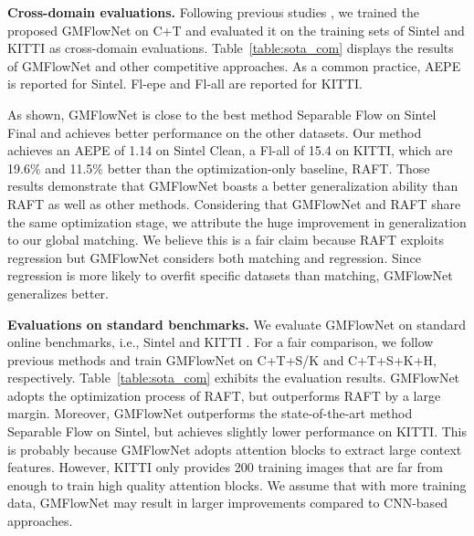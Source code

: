 \documentclass[10pt,twocolumn,letterpaper]{article}
\begin{document}
{\bf Cross-domain evaluations.}
Following previous studies \cite{teed2020raft,jiang2021learning,zhang2021separable}, we trained the proposed GMFlowNet on C+T and evaluated it on the training sets of Sintel and KITTI as cross-domain evaluations. Table~\ref{table:sota_com} displays the results of GMFlowNet and other competitive approaches. As a common practice, AEPE is reported for Sintel. Fl-epe and Fl-all are reported for KITTI.

As shown, GMFlowNet is close to the best method Separable Flow \cite{zhang2021separable} on Sintel Final and achieves better performance on the other datasets. 
Our method achieves an AEPE of 1.14 on Sintel Clean, a Fl-all of 15.4 on KITTI, which are 19.6\% and 11.5\% better than the optimization-only baseline, RAFT. 
Those results demonstrate that GMFlowNet boasts a better generalization ability than RAFT as well as other methods. 
Considering that GMFlowNet and RAFT share the same optimization stage, we attribute the huge improvement in generalization to our global matching. 
We believe this is a fair claim because RAFT exploits regression but GMFlowNet considers both matching and regression. Since regression is more likely to overfit specific datasets than matching, GMFlowNet generalizes better.



{\bf Evaluations on standard benchmarks.}
We evaluate GMFlowNet on standard online benchmarks, i.e., Sintel \cite{butler2012naturalistic} and KITTI \cite{menze2015object}. For a fair comparison, we follow previous methods \cite{teed2020raft,jiang2021learning,zhang2021separable} and train GMFlowNet on C+T+S/K and C+T+S+K+H, respectively.
Table~\ref{table:sota_com} exhibits the evaluation results.
GMFlowNet adopts the optimization process of RAFT, but outperforms RAFT by a large margin. 
Moreover, GMFlowNet outperforms the state-of-the-art method Separable Flow \cite{zhang2021separable} on Sintel, but achieves slightly lower performance on KITTI. 
This is probably because GMFlowNet adopts attention blocks to extract large context features. However, KITTI only provides 200 training images that are far from enough to train high quality attention blocks. 
We assume that with more training data, GMFlowNet may result in larger improvements compared to CNN-based approaches.
\end{document}
